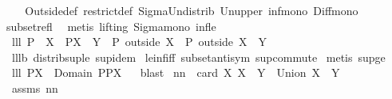 \begin{isabellebody}
\isadelimproof
\ %
\endisadelimproof
%
\isatagproof
{}\isamarkupfalse%
\ \isanewline
Outside{\isacharunderscore}def\ restrict{\isacharunderscore}def\ Sigma{\isacharunderscore}Un{\isacharunderscore}distrib{}\ Un{\isacharunderscore}upper{}\ inf{\isacharunderscore}mono\ Diff{\isacharunderscore}mono\ \isanewline
subset{\isacharunderscore}refl\ \isamarkupfalse%
\ {\isacharparenleft}metis\ {\isacharparenleft}lifting{\isacharparenright}\ Sigma{\isacharunderscore}mono\ inf{\isacharunderscore}le{}{\isacharparenright}%
\endisatagproof
{\isafoldproof}%
%
\isadelimproof
%
\endisadelimproof
\isanewline
\isanewline
{}\isamarkupfalse%
\ lll{}{}{\isacharcolon}\ {\isachardoublequoteopen}P\ {\isacharbar}{\isacharbar}\ X\ {\isasymsubseteq}\ P{\isacharbar}{\isacharbar}{\isacharparenleft}X\ {\isasymunion}\ Y{\isacharparenright}\ {\isacharampersand}\ P\ outside\ X\ {\isasymsubseteq}\ P\ outside\ {\isacharparenleft}X\ {\isasyminter}\ Y{\isacharparenright}{\isachardoublequoteclose}\ \isanewline
%
\isadelimproof
%
\endisadelimproof
%
\isatagproof
{}\isamarkupfalse%
\ lll{}{}b\ distrib{\isacharunderscore}sup{\isacharunderscore}le\ sup{\isacharunderscore}idem\ \isanewline
le{\isacharunderscore}inf{\isacharunderscore}iff\ subset{\isacharunderscore}antisym\ sup{\isacharunderscore}commute\isanewline
{}\isamarkupfalse%
\ {\isacharparenleft}metis\ sup{\isacharunderscore}ge{}{\isacharparenright}%
\endisatagproof
{\isafoldproof}%
%
\isadelimproof
\isanewline
%
\endisadelimproof
\isanewline
{}\isamarkupfalse%
\ lll{}{}{\isacharcolon}\ {\isachardoublequoteopen}P{\isacharbackquote}{\isacharbackquote}{\isacharparenleft}X\ {\isasyminter}\ Domain\ P{\isacharparenright}{\isacharequal}P{\isacharbackquote}{\isacharbackquote}X{\isachardoublequoteclose}%
\isadelimproof
\ %
\endisadelimproof
%
\isatagproof
{}\isamarkupfalse%
\ blast%
\endisatagproof
{\isafoldproof}%
%
\isadelimproof
%
\endisadelimproof
\isanewline
\isanewline
{}\isamarkupfalse%
\ nn{}{}{\isacharcolon}\ \ {\isachardoublequoteopen}card\ X{\isacharequal}{}{\isachardoublequoteclose}\ {\isachardoublequoteopen}X\ {\isasymsubseteq}\ Y{\isachardoublequoteclose}\ \ {\isachardoublequoteopen}Union\ X\ {\isasymin}\ Y{\isachardoublequoteclose}%
\isadelimproof
\ %
\endisadelimproof
%
\isatagproof
{}\isamarkupfalse%
\ assms\ nn{}{}\ \isamarkupfalse%

\end{isabellebody}
